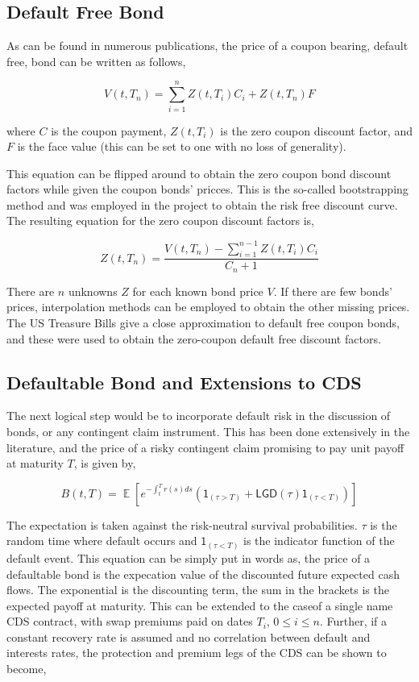 \documentclass[a4paper,12pt]{article}
\DeclareMathOperator*{\E}{\mathbb{E}}
\begin{document}
\subsection{Default Free Bond}
As can be found in numerous publications, the price of a coupon bearing, default free, bond can be written as follows, 

\begin{equation}
V(t, T_n) = \sum_{i = 1}^nZ(t, T_i)C_i + Z(t, T_n)F
\end{equation}

where $C$ is the coupon payment, $Z(t, T_i)$ is the zero coupon discount factor, and $F$ is the face value (this can be set to one with no loss of generality). 

This equation can be flipped around to obtain the zero coupon bond discount factors while given the coupon bonds' pricces. This is the so-called bootstrapping method and was employed in the project to obtain the risk free discount curve. The resulting equation for the zero coupon discount factors is, 

\begin{equation}
Z(t, T_n) = \frac{V(t, T_n) - \sum_{i = 1}^{n - 1}Z(t, T_i)C_i}{C_n + 1}
\end{equation}

There are $n$ unknowns $Z$ for each known bond price $V$. If there are few bonds' prices, interpolation methods can be employed to obtain the other missing prices. The US Treasure Bills give a close approximation to default free coupon bonds, and these were used to obtain the zero-coupon default free discount factors.

\subsection{Defaultable Bond and Extensions to CDS}
The next logical step would be to incorporate default risk in the discussion of bonds, or any contingent claim instrument. This has been done extensively in the literature, and the price of a risky contingent claim promising to pay unit payoff at maturity $T$, is given by,

\begin{equation}
B(t, T) = \E[e^{-\int_t^{T}r(s)ds}\left(\mathsf{1}_{(\tau > T)} + \mathsf{LGD}(\tau)\mathsf{1}_{(\tau < T)}\right)]
\end{equation}

The expectation is taken against the risk-neutral survival probabilities. $\tau$ is the random time where default occurs and $\mathsf{1}_{(\tau < T)}$ is the indicator function of the default event. This equation can be simply put in words as, the price of a defaultable bond is the expecation value of the discounted future expected cash flows. The exponential is the discounting term, the sum in the brackets is the expected payoff at maturity. 
\newline
This can be extended to the caseof a single name CDS contract, with swap premiums paid on dates $T_i$, $0 \leq i \leq n$. Further, if a constant recovery rate is assumed and no correlation between default and interests rates, the protection and premium legs of the CDS can be shown to become, 
\end{document}
